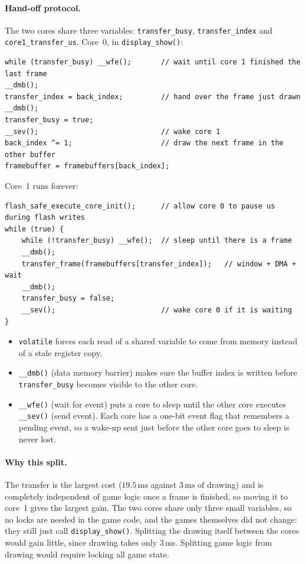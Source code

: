 \documentclass[11pt,a4paper]{article}
\newcommand{\unit}[2]{\ensuremath{#1\,\mathrm{#2}}}
\begin{document}
\paragraph{Hand-off protocol.} The two cores share three variables:
\texttt{transfer\_busy}, \texttt{transfer\_index} and
\texttt{core1\_transfer\_us}. Core~0, in \texttt{display\_show()}:

\begin{lstlisting}
while (transfer_busy) __wfe();       // wait until core 1 finished the last frame
__dmb();
transfer_index = back_index;         // hand over the frame just drawn
__dmb();
transfer_busy = true;
__sev();                             // wake core 1
back_index ^= 1;                     // draw the next frame in the other buffer
framebuffer = framebuffers[back_index];
\end{lstlisting}

\noindent Core~1 runs forever:

\begin{lstlisting}
flash_safe_execute_core_init();      // allow core 0 to pause us during flash writes
while (true) {
    while (!transfer_busy) __wfe();  // sleep until there is a frame
    __dmb();
    transfer_frame(framebuffers[transfer_index]);   // window + DMA + wait
    __dmb();
    transfer_busy = false;
    __sev();                         // wake core 0 if it is waiting
}
\end{lstlisting}

\begin{itemize}
  \item \texttt{volatile} forces each read of a shared variable to come from
        memory instead of a stale register copy.
  \item \texttt{\_\_dmb()} (data memory barrier) makes sure the buffer index is
        written before \texttt{transfer\_busy} becomes visible to the other core.
  \item \texttt{\_\_wfe()} (wait for event) puts a core to sleep until the other
        core executes \texttt{\_\_sev()} (send event). Each core has a one-bit
        event flag that remembers a pending event, so a wake-up sent just before
        the other core goes to sleep is never lost.
\end{itemize}

\paragraph{Why this split.} The transfer is the largest cost (\unit{19.5}{ms}
against \unit{3}{ms} of drawing) and is completely independent of game logic once
a frame is finished, so moving it to core~1 gives the largest gain. The two cores
share only three small variables, so no locks are needed in the game code, and the
games themselves did not change: they still just call \texttt{display\_show()}.
Splitting the drawing itself between the cores would gain little, since drawing
takes only 3\,ms. Splitting game logic from drawing would require locking all
game state.
\end{document}
